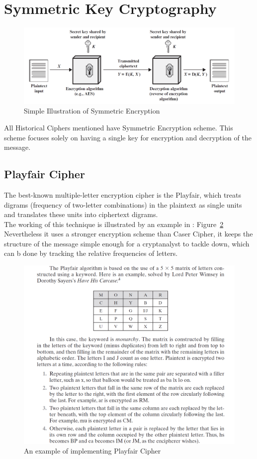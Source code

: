 \documentclass{article}
\begin{document}
\section{Symmetric Key Cryptography}
\begin{figure}[h]
    \centering
    \includegraphics[width=\textwidth]{symkey.png}
    \caption{Simple Illustration of Symmetric Encryption \cite{symkey}}
    \label{fig:symkey}
\end{figure}
All Historical Ciphers mentioned have Symmetric Encryption scheme. This scheme focuses solely on having a single key for encryption and decryption of the message.\\

\subsection{Playfair Cipher}
The best-known multiple-letter encryption cipher is the Playfair, which treats digrams (frequency of two-letter combinations) in the plaintext as single units and translates these units into ciphertext digrams.\\
The working of this technique is illustrated by an example in \cite{playfair}: Figure~\ref{fig:playfair}
Nevertheless it uses a stronger encryption scheme than Caser Cipher, it keeps the structure of the message simple enough for a cryptanalyst to tackle down, which can b done by tracking the relative frequencies of letters.
\begin{figure}[h]
    \centering
    \includegraphics[width=\textwidth]{playfair.png}
    \caption{An example of implementing Playfair Cipher}
    \label{fig:playfair}
\end{figure}
\end{document}
